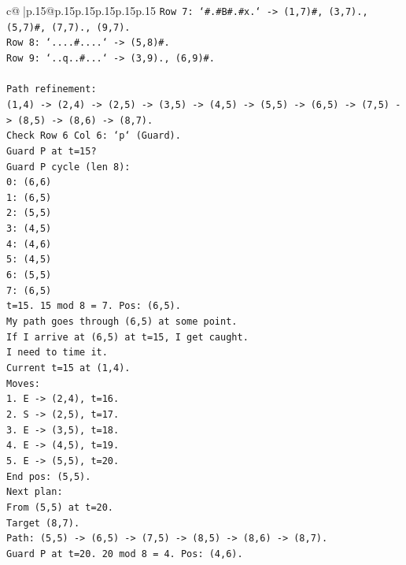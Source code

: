 \documentclass{article}
\begin{document}
{\begin{supertabular}{c@{$\;$}|p{.15\linewidth}@{}p{.15\linewidth}p{.15\linewidth}p{.15\linewidth}p{.15\linewidth}p{.15\linewidth}}
{{{\texttt{Row 7: `\#.\#B\#.\#x.` {-}> (1,7)\#, (3,7)., (5,7)\#, (7,7)., (9,7).} \\
\texttt{Row 8: `....\#....` {-}> (5,8)\#.} \\
\texttt{Row 9: `..q..\#...` {-}> (3,9)., (6,9)\#.} \\
\\ 
\texttt{Path refinement:} \\
\texttt{(1,4) {-}> (2,4) {-}> (2,5) {-}> (3,5) {-}> (4,5) {-}> (5,5) {-}> (6,5) {-}> (7,5) {-}> (8,5) {-}> (8,6) {-}> (8,7).} \\
\texttt{Check Row 6 Col 6: `p` (Guard).} \\
\texttt{Guard P at t=15?} \\
\texttt{Guard P cycle (len 8):} \\
\texttt{0: (6,6)} \\
\texttt{1: (6,5)} \\
\texttt{2: (5,5)} \\
\texttt{3: (4,5)} \\
\texttt{4: (4,6)} \\
\texttt{5: (4,5)} \\
\texttt{6: (5,5)} \\
\texttt{7: (6,5)} \\
\texttt{t=15. 15 mod 8 = 7. Pos: (6,5).} \\
\texttt{My path goes through (6,5) at some point.} \\
\texttt{If I arrive at (6,5) at t=15, I get caught.} \\
\texttt{I need to time it.} \\
\texttt{Current t=15 at (1,4).} \\
\texttt{Moves:} \\
\texttt{1. E {-}> (2,4), t=16.} \\
\texttt{2. S {-}> (2,5), t=17.} \\
\texttt{3. E {-}> (3,5), t=18.} \\
\texttt{4. E {-}> (4,5), t=19.} \\
\texttt{5. E {-}> (5,5), t=20.} \\
\texttt{End pos: (5,5).} \\
\texttt{Next plan:} \\
\texttt{From (5,5) at t=20.} \\
\texttt{Target (8,7).} \\
\texttt{Path: (5,5) {-}> (6,5) {-}> (7,5) {-}> (8,5) {-}> (8,6) {-}> (8,7).} \\
\texttt{Guard P at t=20. 20 mod 8 = 4. Pos: (4,6).} \\
}}}
\end{supertabular}}
\end{document}
